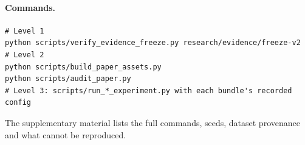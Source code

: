 \paragraph{Commands.}
\begin{verbatim}
# Level 1
python scripts/verify_evidence_freeze.py research/evidence/freeze-v2
# Level 2
python scripts/build_paper_assets.py
python scripts/audit_paper.py
# Level 3: scripts/run_*_experiment.py with each bundle's recorded config
\end{verbatim} The supplementary material lists the full commands, seeds,
dataset provenance and what cannot be reproduced.
